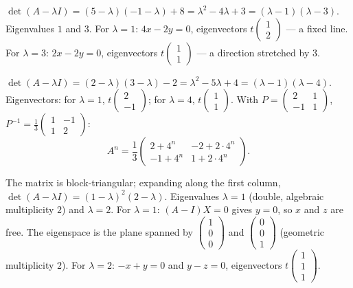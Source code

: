 \documentclass[11pt]{article}
\begin{document}
\begin{corrige}[Exercise 1]
$\det(A-\lambda I)=(5-\lambda)(-1-\lambda)+8=\lambda^2-4\lambda+3=(\lambda-1)(\lambda-3)$. Eigenvalues $1$ and $3$. For $\lambda=1$: $4x-2y=0$, eigenvectors $t\begin{pmatrix}1\\2\end{pmatrix}$ — a fixed line. For $\lambda=3$: $2x-2y=0$, eigenvectors $t\begin{pmatrix}1\\1\end{pmatrix}$ — a direction stretched by $3$.
\end{corrige}

\begin{corrige}[Exercise 2]
$\det(A-\lambda I)=(2-\lambda)(3-\lambda)-2=\lambda^2-5\lambda+4=(\lambda-1)(\lambda-4)$. Eigenvectors: for $\lambda=1$, $t\begin{pmatrix}2\\-1\end{pmatrix}$; for $\lambda=4$, $t\begin{pmatrix}1\\1\end{pmatrix}$. With $P=\begin{pmatrix}2&1\\-1&1\end{pmatrix}$, $P^{-1}=\frac13\begin{pmatrix}1&-1\\1&2\end{pmatrix}$:
\[ A^n=\frac13\begin{pmatrix}2+4^n & -2+2\cdot4^n\\ -1+4^n & 1+2\cdot4^n\end{pmatrix}. \]
\end{corrige}

\begin{corrige}[Exercise 3]
The matrix is block-triangular; expanding along the first column, $\det(A-\lambda I)=(1-\lambda)^2(2-\lambda)$. Eigenvalues $\lambda=1$ (double, algebraic multiplicity $2$) and $\lambda=2$. For $\lambda=1$: $(A-I)X=0$ gives $y=0$, so $x$ and $z$ are free. The eigenspace is the plane spanned by $\begin{pmatrix}1\\0\\0\end{pmatrix}$ and $\begin{pmatrix}0\\0\\1\end{pmatrix}$ (geometric multiplicity $2$). For $\lambda=2$: $-x+y=0$ and $y-z=0$, eigenvectors $t\begin{pmatrix}1\\1\\1\end{pmatrix}$.
\end{corrige}
\end{document}
